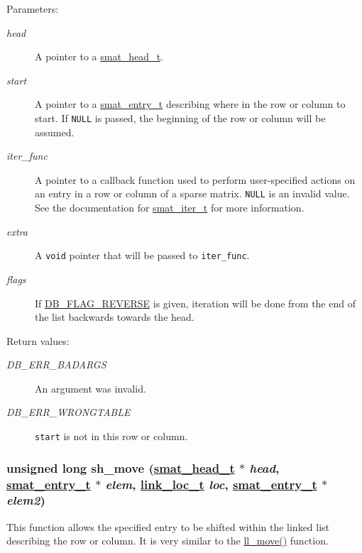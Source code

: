 \begin{Desc}
\item[Parameters:]
\begin{description}
\item[{\em head}]A pointer to a \hyperlink{group__dbprim__smat_a1}{smat\_\-head\_\-t}. \item[{\em start}]A pointer to a \hyperlink{group__dbprim__smat_a2}{smat\_\-entry\_\-t} describing where in the row or column to start. If {\tt NULL} is passed, the beginning of the row or column will be assumed. \item[{\em iter\_\-func}]A pointer to a callback function used to perform user-specified actions on an entry in a row or column of a sparse matrix. {\tt NULL} is an invalid value. See the documentation for \hyperlink{group__dbprim__smat_a4}{smat\_\-iter\_\-t} for more information. \item[{\em extra}]A {\tt void} pointer that will be passed to {\tt iter\_\-func}. \item[{\em flags}]If \hyperlink{group__dbprim_a4}{DB\_\-FLAG\_\-REVERSE} is given, iteration will be done from the end of the list backwards towards the head.\end{description}
\end{Desc}
\begin{Desc}
\item[Return values:]
\begin{description}
\item[{\em DB\_\-ERR\_\-BADARGS}]An argument was invalid. \item[{\em DB\_\-ERR\_\-WRONGTABLE}]{\tt start} is not in this row or column. \end{description}
\end{Desc}
\hypertarget{group__dbprim__smat_a18}{
\subsubsection[sh\_\-move]{\setlength{\rightskip}{0pt plus 5cm}unsigned long sh\_\-move (\hyperlink{dbprim_8h_a1}{smat\_\-head\_\-t} $\ast$ {\em head}, \hyperlink{dbprim_8h_a2}{smat\_\-entry\_\-t} $\ast$ {\em elem}, \hyperlink{dbprim_8h_a4}{link\_\-loc\_\-t} {\em loc}, \hyperlink{dbprim_8h_a2}{smat\_\-entry\_\-t} $\ast$ {\em elem2})}}
\label{group__dbprim__smat_a18}


This function allows the specified entry to be shifted within the linked list describing the row or column. It is very similar to the \hyperlink{group__dbprim__link_a7}{ll\_\-move()} function.

